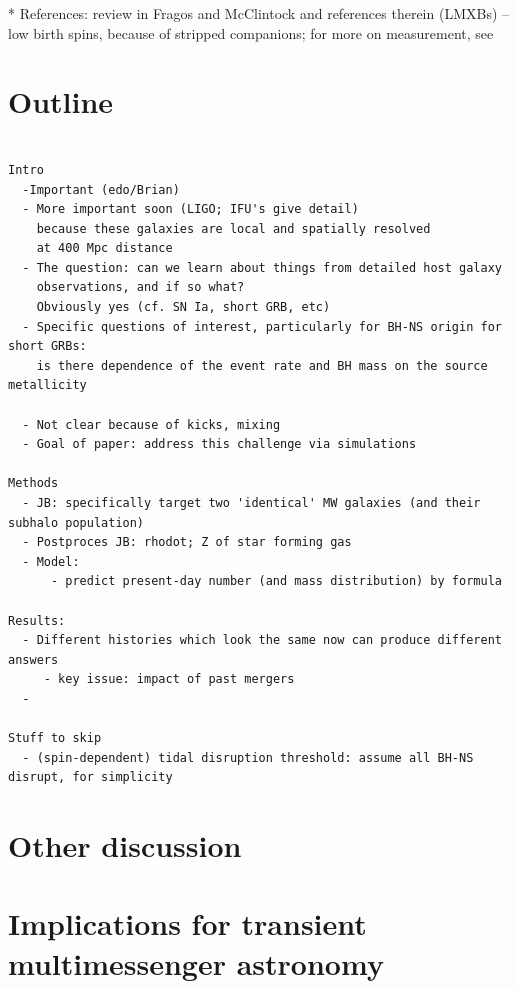 \documentclass[nofootinbib,twocolumn,prd]{emulateapj}
\begin{document}
* References: review in Fragos and McClintock \cite{2015ApJ...800...17F}  and references therein (LMXBs) -- low birth
spins, because of stripped companions; for more on measurement, see \cite{2011CQGra..28k4009M}



\section{Outline }
\begin{verbatim}

Intro
  -Important (edo/Brian)
  - More important soon (LIGO; IFU's give detail)
    because these galaxies are local and spatially resolved
    at 400 Mpc distance
  - The question: can we learn about things from detailed host galaxy 
    observations, and if so what?
    Obviously yes (cf. SN Ia, short GRB, etc)
  - Specific questions of interest, particularly for BH-NS origin for short GRBs:
    is there dependence of the event rate and BH mass on the source metallicity

  - Not clear because of kicks, mixing
  - Goal of paper: address this challenge via simulations

Methods
  - JB: specifically target two 'identical' MW galaxies (and their subhalo population)
  - Postproces JB: rhodot; Z of star forming gas
  - Model:
      - predict present-day number (and mass distribution) by formula 

Results:
  - Different histories which look the same now can produce different answers
     - key issue: impact of past mergers
  - 

Stuff to skip
  - (spin-dependent) tidal disruption threshold: assume all BH-NS disrupt, for simplicity
\end{verbatim}


\section{Other discussion}


\section{Implications for transient multimessenger astronomy}


\end{document}
